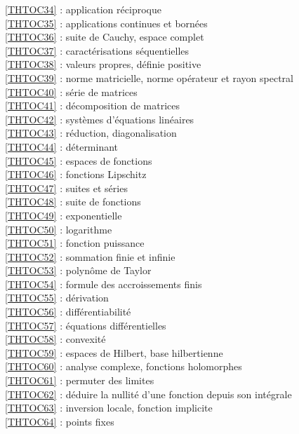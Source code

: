 \ref {THTOC34} : application réciproque\\
\ref {THTOC35} : applications continues et bornées\\
\ref {THTOC36} : suite de Cauchy, espace complet\\
\ref {THTOC37} : caractérisations séquentielles\\
\ref {THTOC38} : valeurs propres, définie positive\\
\ref {THTOC39} : norme matricielle, norme opérateur et rayon spectral\\
\ref {THTOC40} : série de matrices\\
\ref {THTOC41} : décomposition de matrices\\
\ref {THTOC42} : systèmes d'équations linéaires\\
\ref {THTOC43} : réduction, diagonalisation\\
\ref {THTOC44} : déterminant\\
\ref {THTOC45} : espaces de fonctions\\
\ref {THTOC46} : fonctions Lipschitz\\
\ref {THTOC47} : suites et séries\\
\ref {THTOC48} : suite de fonctions\\
\ref {THTOC49} : exponentielle\\
\ref {THTOC50} : logarithme\\
\ref {THTOC51} : fonction puissance\\
\ref {THTOC52} : sommation finie et infinie\\
\ref {THTOC53} : polynôme de Taylor\\
\ref {THTOC54} : formule des accroissements finis\\
\ref {THTOC55} : dérivation\\
\ref {THTOC56} : différentiabilité\\
\ref {THTOC57} : équations différentielles\\
\ref {THTOC58} : convexité\\
\ref {THTOC59} : espaces de Hilbert, base hilbertienne\\
\ref {THTOC60} : analyse complexe, fonctions holomorphes\\
\ref {THTOC61} : permuter des limites\\
\ref {THTOC62} : déduire la nullité d'une fonction depuis son intégrale\\
\ref {THTOC63} : inversion locale, fonction implicite\\
\ref {THTOC64} : points fixes\\
